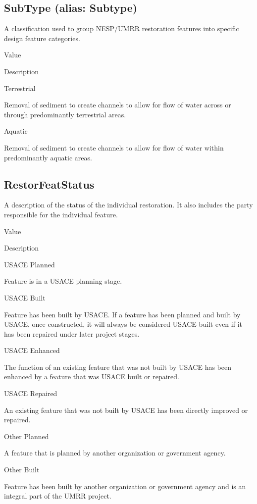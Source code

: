 \documentclass[
  letterpaper,
  DIV=11,
  numbers=noendperiod]{scrreprt}
\begin{document}
\subsection{SubType (alias: Subtype)}\label{subtype-alias-subtype-5}

A classification used to group NESP/UMRR restoration features into
specific design feature categories.

Value

Description

Terrestrial

Removal of sediment to create channels to allow for flow of water across
or through predominantly terrestrial areas.

Aquatic

Removal of sediment to create channels to allow for flow of water within
predominantly aquatic areas.

\subsection{RestorFeatStatus}\label{restorfeatstatus-5}

A description of the status of the individual restoration. It also
includes the party responsible for the individual feature.

Value

Description

USACE Planned

Feature is in a USACE planning stage.

USACE Built

Feature has been built by USACE. If a feature has been planned and built
by USACE, once constructed, it will always be considered USACE built
even if it has been repaired under later project stages.

USACE Enhanced

The function of an existing feature that was not built by USACE has been
enhanced by a feature that was USACE built or repaired.

USACE Repaired

An existing feature that was not built by USACE has been directly
improved or repaired.

Other Planned

A feature that is planned by another organization or government agency.

Other Built

Feature has been built by another organization or government agency and
is an integral part of the UMRR project.
\end{document}
